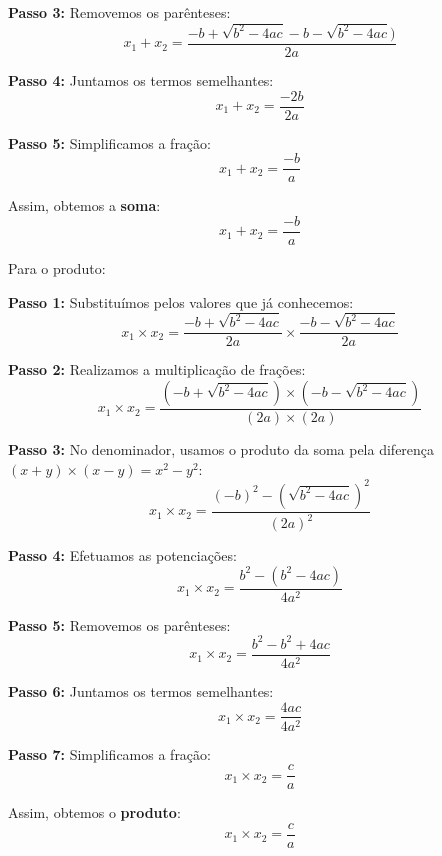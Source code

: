 \documentclass[12pt]{report}
\newcommand{\1}{\faThermometerEmpty}
\newcommand{\2}{\faThermometerQuarter}
\newcommand{\3}{\faThermometerHalf}
\newcommand{\4}{\faThermometerThreeQuarters}
\newcommand{\5}{\faThermometerFull}
\begin{document}
\textbf{Passo 3:} Removemos os parênteses:
$$x_1+x_2 = \frac{-b + \sqrt{b^2 - 4ac} -b - \sqrt{b^2 - 4ac})}{2a}$$

\textbf{Passo 4:} Juntamos os termos semelhantes:
$$x_1+x_2 = \frac{-2b}{2a}$$

\textbf{Passo 5:} Simplificamos a fração:
$$x_1+x_2 =\frac{-b}{a}$$

Assim, obtemos a \textbf{soma}:
\[
x_1+x_2 = \frac{-b}{a}
\]

\break

Para o produto:

\textbf{Passo 1:} Substituímos pelos valores que já conhecemos:
$$x_1 \times x_2 = \frac{-b + \sqrt{b^2 - 4ac}}{2a} \times \frac{-b - \sqrt{b^2 - 4ac}}{2a}$$

\textbf{Passo 2:} Realizamos a multiplicação de frações:
$$x_1 \times x_2 = \frac{(-b + \sqrt{b^2 - 4ac})\times(-b - \sqrt{b^2 - 4ac})}{(2a) \times (2a)}$$

\textbf{Passo 3:} No denominador, usamos o produto da soma pela diferença $(x+y)\times(x-y)=x^2-y^2$:
$$x_1 \times x_2 = \frac{(-b)^2 - \left(\sqrt{b^2 - 4ac}\right)^2}{(2a)^2}$$

\textbf{Passo 4:} Efetuamos as potenciações:
$$x_1 \times x_2 = \frac{b^2 - \left(b^2 - 4ac\right)}{4a^2}$$

\textbf{Passo 5:} Removemos os parênteses:
$$x_1 \times x_2 = \frac{b^2 - b^2 + 4ac}{4a^2}$$

\textbf{Passo 6:} Juntamos os termos semelhantes:
$$x_1 \times x_2 = \frac{4ac}{4a^2}$$

\textbf{Passo 7:} Simplificamos a fração:
$$x_1 \times x_2 = \frac{c}{a}$$

Assim, obtemos o \textbf{produto}:
\[
x_1 \times x_2 = \frac{c}{a}
\]
\end{document}
